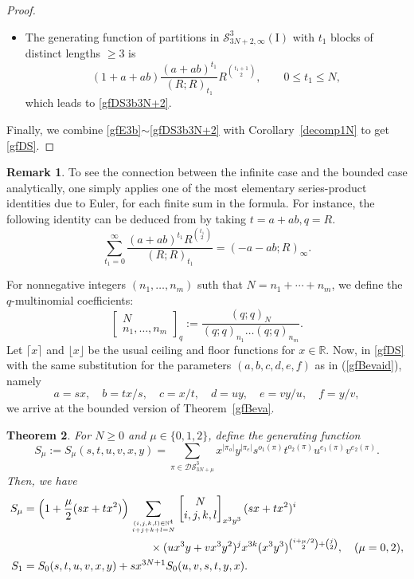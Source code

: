 \documentclass[12pt]{amsart}
\numberwithin{equation}{section}
\theoremstyle{plain}
\newtheorem{theorem}{Theorem}[section]
\theoremstyle{definition}
\newtheorem{remark}[theorem]{Remark}
\newcommand{\N}{\mathbb{N}}
\newcommand{\R}{\mathbb{R}}
\def\R{\mathbb{R}}
\newcommand\qbin[3]{\left[\begin{matrix} #1 \\ #2 \end{matrix} \right]_{#3}}
\begin{document}
\begin{proof}
\begin{itemize}
\item The generating function of partitions in $\mathcal{S}^3_{3N+2,\infty}(\text{I})$ with  
$t_1$ blocks of distinct lengths $\geq 3$ is 
$$
(1+a+ab)\dfrac{(a+ab)^{t_1}}{(R;R)_{t_1}}R^{\binom{t_1+1}{2}}, \qquad 0\leq  t_1\leq N,
$$ 
which leads to \eqref{gfDS3b3N+2}.
\end{itemize}
Finally, we combine \eqref{gfE3b}$\sim$\eqref{gfDS3b3N+2} with Corollary~\ref{decomp1N} to get \eqref{gfDS}.
\end{proof}

\begin{remark}\label{bdtoinfrmk}
To see the connection between the infinite case and the bounded case analytically, one simply applies one of the most elementary series-product identities due to Euler, for each finite sum in the formula. For instance, the following identity can be deduced from \cite[(2.2.6)]{andtp} by taking $t=a+ab, q=R$.
$$
\sum\limits_{t_1=0}^{\infty}\dfrac{(a+ab)^{t_1}R^{\binom{t_1}{2}}}{(R;R)_{t_1}}=(-a-ab;R)_{\infty}.
$$
\end{remark}

For nonnegative integers $(n_1, \ldots, n_m)$ suth that $N=n_1+\cdots+ n_m$, 
we define the $q$-multinomial coefficients:
$$
\qbin{N}{n_1,\ldots, n_m}{q}:=\dfrac{(q;q)_{N}}{ (q;q)_{n_1}\ldots(q;q)_{n_m}}.
$$
Let $\lceil x \rceil$ and $\lfloor x \rfloor$ be the usual ceiling and floor functions for $x\in \R$.
Now, in \eqref{gfDS}
with the same substitution for the parameters $(a, b, c, d, e,f)$ as in (\ref{gfBevaid}), namely 
$$
a=sx, \quad b=tx/s,  \quad c=x/t,  \quad d=uy,  \quad e=vy/u, \quad  f=y/v,
$$
 we arrive at the bounded version of Theorem~\ref{gfBeva}. 
\begin{theorem}\label{gfBeva-bounded}
 For $N\geq 0$ and $\mu\in \{0,1, 2\}$, define the generating function
 $$
 S_\mu:=S_\mu(s,t,u,v,x,y)=\sum\limits_{\pi\in\mathcal{DS}_{3N+\mu}^3}x^{|\pi_o|}y^{|\pi_e|}s^{o_1(\pi)}t^{o_2(\pi)}u^{e_1(\pi)}v^{e_2(\pi)}.
 $$
 Then,  we have 
\begin{align}\label{gfBevaid-bounded-02}
 S_\mu&= \left(1+\frac{\mu}{2}(sx+tx^2)\right)\sum_{(i,j,k,l)\in \N^4\atop i+j+k+l=N} \qbin{N}{i,j,k,l}{x^3y^3}(sx+tx^2)^{i}\\
\nonumber
&\hspace{4cm}\times (ux^3y+vx^3y^2)^{j}x^{3k}
(x^3y^3)^{\binom{i+{\mu}/{2}}{2}+\binom{j}{2}},\quad (\mu=0,2),\\
S_1&=S_0(s,t,u,v,x,y)+sx^{3N+1} S_0(u,v,s,t,y,x).\label{gfBevaid-bounded-1}
\end{align}








\end{theorem}
\end{document}
